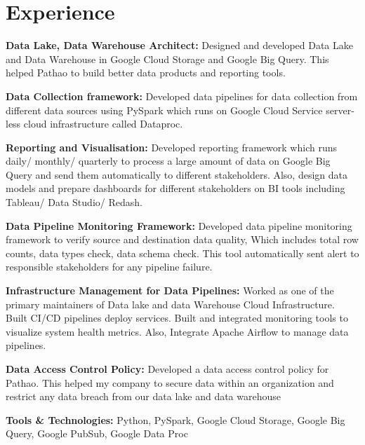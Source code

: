 \documentclass[letterpaper]{deedy-resume} %
\begin{document}
\hfill
%
%
\begin{minipage}[t]{0.66\textwidth} %


\section{Experience}


\vspace{\topsep} %
\begin{tightitemize}
\sectionspace
\item \textbf{Data Lake, Data Warehouse Architect:}
Designed and developed Data Lake and Data Warehouse in Google Cloud Storage and Google Big Query. This helped Pathao to build better data products and reporting tools.
\item \textbf{Data Collection framework:}
Developed data pipelines for data collection from different data sources using PySpark which runs on Google Cloud Service server-less cloud infrastructure called Dataproc.
\item \textbf{Reporting and Visualisation:}
Developed reporting framework which runs daily/ monthly/ quarterly to process a large amount of data on Google Big Query and send them automatically to different stakeholders. Also, design data models and prepare dashboards for different stakeholders on BI tools including Tableau/ Data Studio/ Redash.
\item \textbf{Data Pipeline Monitoring Framework:}
Developed data pipeline monitoring framework to verify source and destination data quality, Which includes total row counts, data types check, data schema check. This tool automatically sent alert to responsible stakeholders for any pipeline failure.
\item \textbf{Infrastructure Management for Data Pipelines:}
Worked as one of the primary maintainers of Data lake and data Warehouse Cloud Infrastructure. Built CI/CD pipelines deploy services. Built and integrated monitoring tools to visualize system health metrics. Also, Integrate Apache Airflow to manage data pipelines.
\item \textbf{Data Access Control Policy:}
Developed a data access control policy for Pathao. This helped my company to secure data within an organization and restrict any data breach from our data lake and data warehouse
\item \textbf{Tools & Technologies:} Python, PySpark, Google Cloud Storage, Google Big Query, Google PubSub, Google Data Proc
\end{tightitemize}


\end{minipage}
\end{document}
